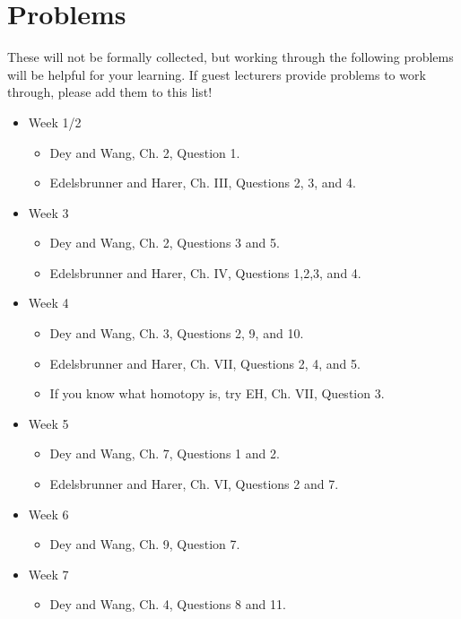 \documentclass{article}
\begin{document}
\section*{Problems}

These will not be formally collected, but working through the following problems
will be helpful for your learning.  If guest lecturers provide problems to work
through, please add them to this list!

\begin{itemize}
    \item Week 1/2
        \begin{itemize}
            \item Dey and Wang, Ch. 2, Question 1.
            \item Edelsbrunner and Harer, Ch. III, Questions 2, 3, and 4.
        \end{itemize}
    \item Week 3
        \begin{itemize}
            \item Dey and Wang, Ch. 2, Questions 3 and 5.
            \item Edelsbrunner and Harer, Ch. IV, Questions 1,2,3, and 4.
        \end{itemize}
    \item Week 4
        \begin{itemize}
            \item Dey and Wang, Ch. 3, Questions 2, 9, and 10.
            \item Edelsbrunner and Harer, Ch. VII, Questions 2, 4, and 5.
            \item If you know what homotopy is, try EH, Ch. VII, Question 3.
        \end{itemize}
    \item Week 5
        \begin{itemize}
            \item Dey and Wang, Ch. 7, Questions 1 and 2.
            \item Edelsbrunner and Harer, Ch. VI, Questions 2 and 7.
        \end{itemize}
    \item Week 6
        \begin{itemize}
            \item Dey and Wang, Ch. 9, Question 7.
        \end{itemize}
    \item Week 7
        \begin{itemize}
            \item Dey and Wang, Ch. 4, Questions 8 and 11.
        \end{itemize}
\end{itemize}
\end{document}
